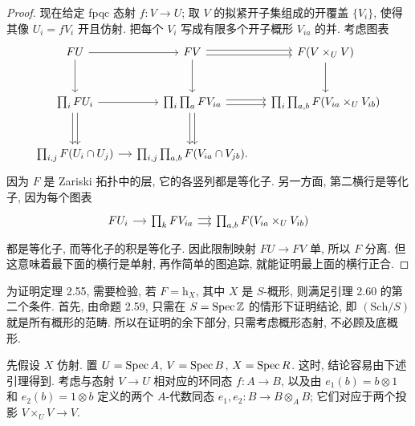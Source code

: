 \begin{proof}
现在给定 fpqc 态射 $f:V\to U$; 取 $V$ 的拟紧开子集组成的开覆盖 $\{V_i\}$, 使得其像 $U_i=fV_i$ 开且仿射. 把每个 $V_i$ 写成有限多个开子概形 $V_{ia}$ 的并. 考虑图表
\[
\begin{tikzcd}[column sep=small,row sep=large]
FU\arrow[r]\arrow[d]&FV\arrow[r,shift left=.5ex]\arrow[r,shift right=.5ex]\arrow[d]&F(V\times_UV)\arrow[d]\\
\prod_iFU_i\arrow[r]\arrow[d,shift left=.5ex]\arrow[d,shift right=.5ex]&\prod_i\prod_aFV_{ia}\arrow[r,shift left=.5ex]\arrow[r,shift right=.5ex]\arrow[d,shift left=.5ex]\arrow[d,shift right=.5ex]&\prod_i\prod_{a,b}F(V_{ia}\times_UV_{ib})\\
\prod_{i,j}F(U_i\cap U_j)\arrow[r]&\prod_{i,j}\prod_{a,b}F(V_{ia}\cap V_{jb}).&
\end{tikzcd}
\]
因为 $F$ 是 Zariski 拓扑中的层, 它的各竖列都是等化子. 另一方面, 第二横行是等化子, 因为每个图表
\[
\begin{tikzcd}[column sep=small]
FU_i\arrow[r]&\prod_kFV_{ia}\arrow[r,shift left=.5ex]\arrow[r,shift right=.5ex]&\prod_{a,b}F(V_{ia}\times_UV_{ib})
\end{tikzcd}
\]
都是等化子, 而等化子的积是等化子.
因此限制映射 $FU\to FV$ 单, 所以 $F$ 分离. 但这意味着最下面的横行是单射, 再作简单的图追踪, 就能证明最上面的横行正合.
\end{proof}

为证明定理 2.55, 需要检验, 若 $F=\mathrm h_X$, 其中 $X$ 是 $S$-概形, 则满足引理 2.60 的第二个条件. 首先, 由命题 2.59, 只需在 $S=\operatorname{Spec}\mathbb Z$ 的情形下证明结论, 即 $(\mathrm{Sch}/S)$ 就是所有概形的范畴. 所以在证明的余下部分, 只需考虑概形态射, 不必顾及底概形.

先假设 $X$ 仿射. 置 $U=\operatorname{Spec} A$, $V=\operatorname{Spec} B$, $X=\operatorname{Spec} R$. 这时, 结论容易由下述引理得到. 考虑与态射 $V\to U$ 相对应的环同态 $f:A\to B$, 以及由 $e_1(b)=b\otimes1$ 和 $e_2(b)=1\otimes b$ 定义的两个 $A$-代数同态 $e_1,e_2:B\to B\otimes_AB$; 它们对应于两个投影 $V\times_UV\to V$.

